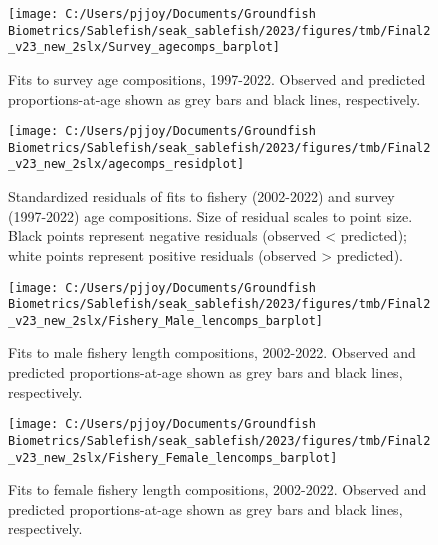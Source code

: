\documentclass[
]{article}
\begin{document}
\begin{figure}[H]

{\centering \texttt{[image: C:/Users/pjjoy/Documents/Groundfish Biometrics/Sablefish/seak\_sablefish/2023/figures/tmb/Final2\_v23\_new\_2slx/Survey\_agecomps\_barplot]} 

}

\caption{Fits to survey age compositions, 1997-2022. Observed and predicted proportions-at-age shown as grey bars and black lines, respectively.}\label{fig:srvage}
\end{figure}

\begin{figure}[H]

{\centering \texttt{[image: C:/Users/pjjoy/Documents/Groundfish Biometrics/Sablefish/seak\_sablefish/2023/figures/tmb/Final2\_v23\_new\_2slx/agecomps\_residplot]} 

}

\caption{Standardized residuals of fits to fishery (2002-2022) and survey (1997-2022) age compositions. Size of residual scales to point size. Black points represent negative residuals (observed < predicted); white points represent positive residuals (observed > predicted).}\label{fig:residage}
\end{figure}

\begin{figure}[H]

{\centering \texttt{[image: C:/Users/pjjoy/Documents/Groundfish Biometrics/Sablefish/seak\_sablefish/2023/figures/tmb/Final2\_v23\_new\_2slx/Fishery\_Male\_lencomps\_barplot]} 

}

\caption{Fits to male fishery length compositions, 2002-2022. Observed and predicted proportions-at-age shown as grey bars and black lines, respectively.}\label{fig:malefshlen}
\end{figure}

\begin{figure}[H]

{\centering \texttt{[image: C:/Users/pjjoy/Documents/Groundfish Biometrics/Sablefish/seak\_sablefish/2023/figures/tmb/Final2\_v23\_new\_2slx/Fishery\_Female\_lencomps\_barplot]} 

}

\caption{Fits to female fishery length compositions, 2002-2022. Observed and predicted proportions-at-age shown as grey bars and black lines, respectively.}\label{fig:femalefshlen}
\end{figure}
\end{document}
